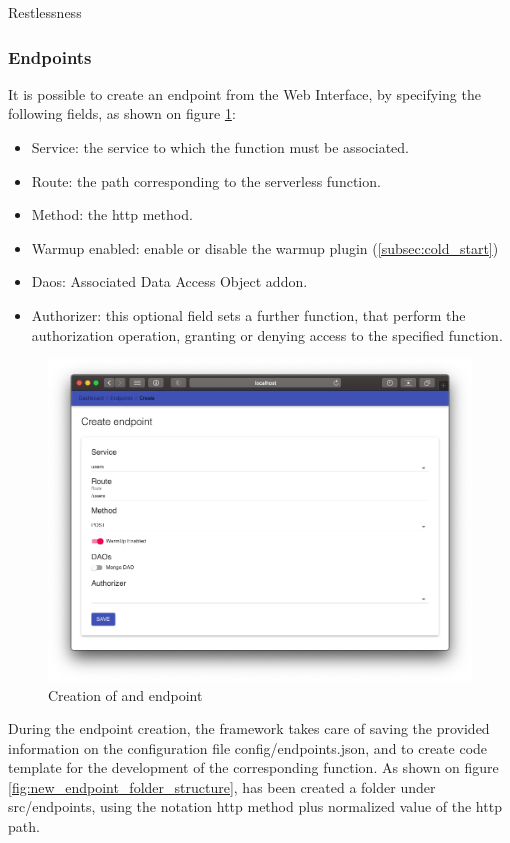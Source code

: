 \begin{chapter}{Restlessness}
    \subsubsection{Endpoints}
    \label{subsec:endpoints}
    It is possible to create an endpoint from the Web Interface, by specifying the
    following fields, as shown on figure \ref{fig:wi_create_endpoint}:
    \begin{itemize}
        \item Service: the service to which the function must be associated.
        \item Route: the path corresponding to the serverless function.
        \item Method: the http method.
        \item Warmup enabled: enable or disable the warmup plugin
            (\ref{subsec:cold_start})
        \item Daos: Associated Data Access Object addon.
        \item Authorizer: this optional field sets a further function, that
            perform the authorization operation, granting or denying access to
            the specified function.
    \end{itemize}

    \begin{figure}
        \centering
        \includegraphics[width=\linewidth]{source/images/rln-wi-create-endpoint.png}
        \caption{Creation of and endpoint}
        \label{fig:wi_create_endpoint}
    \end{figure}

    During the endpoint creation, the framework takes care of saving the provided
    information on the configuration file config/endpoints.json, and to create code
    template for the development of the corresponding function.
    As shown on figure \ref{fig:new_endpoint_folder_structure}, has been created a
    folder under src/endpoints, using the notation http method plus normalized value
    of the http path.


\end{chapter}
